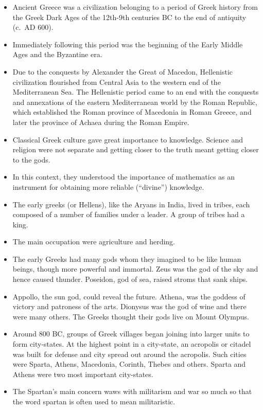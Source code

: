 \documentclass[
  openany]{book}
\providecommand{\tightlist}{%
  \setlength{\itemsep}{0pt}\setlength{\parskip}{0pt}}
\begin{document}
\begin{itemize}
\tightlist
\item
  Ancient Greece was a civilization belonging to a period of Greek history from the Greek Dark Ages of the 12th-9th centuries BC to the end of antiquity (c.~AD 600).
\item
  Immediately following this period was the beginning of the Early Middle Ages and the Byzantine era.
\item
  Due to the conquests by Alexander the Great of Macedon, Hellenistic civilization flourished from Central Asia to the western end of the Mediterranean Sea. The Hellenistic period came to an end with the conquests and annexations of the eastern Mediterranean world by the Roman Republic, which established the Roman province of Macedonia in Roman Greece, and later the province of Achaea during the Roman Empire.
\item
  Classical Greek culture gave great importance to knowledge. Science and religion were not separate and getting closer to the truth meant getting closer to the gods.
\item
  In this context, they understood the importance of mathematics as an instrument for obtaining more reliable (``divine'') knowledge.
\item
  The early greeks (or Hellens), like the Aryans in India, lived in tribes, each composed of a number of families under a leader. A group of tribes had a king.
\item
  The main occupation were agriculture and herding.
\item
  The early Greeks had many gods whom they imagined to be like human beings, though more powerful and immortal. Zeus was the god of the sky and hence caused thunder. Poseidon, god of sea, raised stroms that sank ships.
\item
  Appollo, the sun god, could reveal the future. Athena, was the goddess of victory and patroness of the arts. Dionysus was the god of wine and there were many others. The Greeks thought their gods live on Mount Olympus.
\item
  Around 800 BC, groups of Greek villages began joining into larger units to form city-states. At the highest point in a city-state, an acropolis or citadel was built for defense and city spread out around the acropolis. Such cities were Sparta, Athens, Macedonia, Corinth, Thebes and others. Sparta and Athens were two most important city-states.
\item
  The Spartan's main concern waws with militarism and war so much so that the word spartan is often used to mean militaristic.

\end{itemize}
\end{document}

